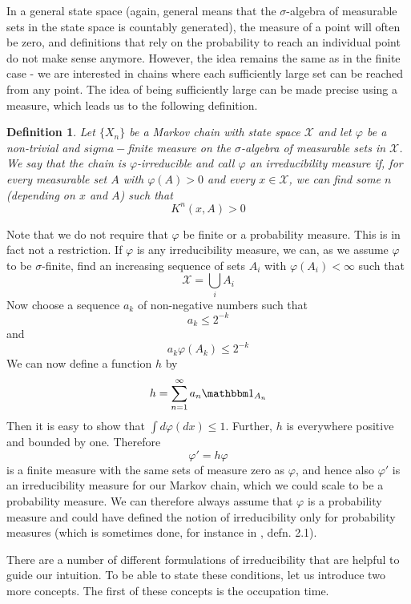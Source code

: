 \documentclass[a4paper, draft]{article}
\theoremstyle{own}
\newtheorem{defn}{Definition}[section]
\theoremstyle{remark}
\begin{document}
In a general state space (again, general means that the $\sigma$-algebra of measurable sets in the state space is countably generated), the measure of a point will often be zero, and definitions that rely on the probability to reach an individual point do not make sense anymore. However, the idea remains the same as in the finite case - we are interested in chains where each sufficiently large set can be reached from any point. The idea of being sufficiently large can be made precise using a measure, which leads us to the following definition.

\begin{defn}
	Let $\{X_n\}$ be a Markov chain with state space ${\mathcal X}$ and let $\varphi$ be a non-trivial and $sigma-$finite measure on the $\sigma$-algebra of measurable sets in ${\mathcal X}$. We say that the chain is {\em $\varphi$-irreducible} and call $\varphi$ an {\em irreducibility measure} if, for every measurable set $A$ with $\varphi(A) > 0$ and every $x \in {\mathcal X}$, we can find some $n$ (depending on $x$ and $A$) such that
	$$
	K^n(x,A) > 0
	$$
\end{defn}

Note that we do not require that $\varphi$ be finite or a probability measure. This is in fact not a restriction. If $\varphi$ is any irreducibility measure, we can, as we assume $\varphi$ to be $\sigma$-finite, find an increasing sequence of sets $A_i$ with $\varphi(A_i) < \infty$ such that  
$$
{\mathcal X} = \bigcup_i A_i
$$
Now choose a sequence $a_k$ of non-negative numbers such that 
$$
a_k \leq 2^{-k}
$$
and
$$
a_k \varphi(A_k) \leq 2^{-k}
$$
We can now define a function $h$ by
$$
h = \sum_{n=1}^\infty a_n {\mathbbm 1}_{A_n}
$$
Then it is easy to show that $\int d \varphi(dx) \leq 1$. Further, $h$ is everywhere positive and bounded by one. Therefore 
$$
\varphi' = h \varphi
$$
is a finite measure with the same sets of measure zero as $\varphi$, and hence also $\varphi'$ is an irreducibility measure for our Markov chain, which we could scale to be a probability measure. We can therefore always assume that $\varphi$ is a probability measure and could have defined the notion of irreducibility only for probability measures (which is sometimes done, for instance in \cite{Revuz}, defn. 2.1).

There are a number of different formulations of irreducibility that are helpful to guide our intuition. To be able to state these conditions, let us introduce two more concepts. The first of these concepts is the occupation time.
\end{document}
